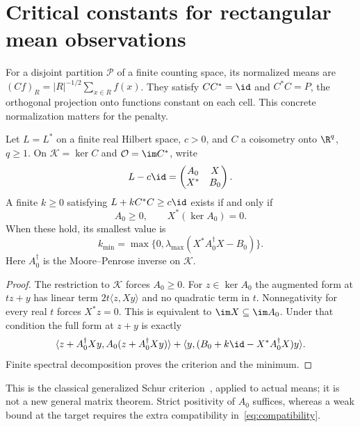 \section{Critical constants for rectangular mean observations}
For a disjoint partition $\mathcal P$ of a finite counting space, its
normalized means are $(Cf)_R=|R|^{-1/2}\sum_{x\in R}f(x)$. They satisfy
$CC^*=\id$ and $C^*C=P$, the orthogonal projection onto functions constant
on each cell. This concrete normalization matters for the penalty.

\begin{theorem}\label{thm:critical}
Let $L=L^*$ on a finite real Hilbert space, $c>0$, and $C$ a coisometry
onto $\R^q$, $q\geq1$. On $\mathcal K=\ker C$ and
$\mathcal O=\im C^*$, write
\[
 L-c\id=\begin{pmatrix}A_0&X\\X^*&B_0\end{pmatrix}.
\]
A finite $k\geq0$ satisfying $L+kC^*C\geq c\id$ exists if and only if
\begin{equation}\label{eq:compatibility}
 A_0\geq0,\qquad X^*(\ker A_0)=0.
\end{equation}
When these hold, its smallest value is
\[
 k_{\min}=\max\{0,\lambda_{\max}(X^*A_0^\dagger X-B_0)\}.
\]
Here $A_0^\dagger$ is the Moore--Penrose inverse on $\mathcal K$.
\end{theorem}
\begin{proof}
The restriction to $\mathcal K$ forces $A_0\geq0$. For $z\in\ker A_0$
the augmented form at $tz+y$ has linear term $2t\langle z,Xy\rangle$
and no quadratic term in $t$. Nonnegativity for every real $t$ forces
$X^*z=0$. This is equivalent to $\im X\subseteq\im A_0$. Under that
condition the full form at $z+y$ is exactly
\[
 \langle z+A_0^\dagger Xy,A_0(z+A_0^\dagger Xy)\rangle
 +\langle y,(B_0+k\id-X^*A_0^\dagger X)y\rangle.
\]
Finite spectral decomposition proves the criterion and the minimum.
\end{proof}
This is the classical generalized Schur criterion~\cite[Theorem 1]{Higham},
applied to actual means; it is not a new general matrix theorem. Strict
positivity of $A_0$ suffices, whereas a weak bound at the target requires
the extra compatibility in~\eqref{eq:compatibility}.

